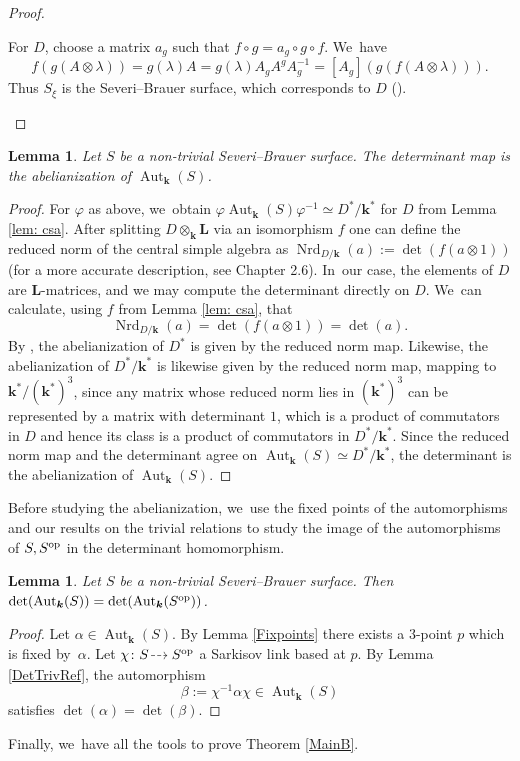 \documentclass[JEP,XML,SOM,Unicode,NoFloatCountersInSection, NoEqCountersInSection,published]{cedram}
\newcommand{\dradpl}{{\hspace*{-2mm}\begin{tikzcd}[ampersand replacement=\&,column sep = scriptsize]\mbox{}\ar[r,dashed]\&\mbox{}\end{tikzcd}\hspace*{-2mm}}}
\newcommand{\dratst}{{\hspace*{-2.5mm}\begin{tikzcd}[ampersand replacement=\&,column sep = small]\mbox{}\ar[r,dashed]\&\mbox{}\end{tikzcd}\hspace*{-2mm}}}
\let\drascst\dratst
\newcommand{\dra}{\mathchoice{\dradpl}{\dratst}{\drascst}{\drascst}}
\newcommand{\op}{\textup{op}}
\DeclareMathOperator{\Nrd}{Nrd}
\newtheorem{lemma}[theorem]{Lemma}
\theoremstyle{definition}
\newcommand{\kk}{{\boldsymbol{k}}}
\newcommand{\LL}{{\boldsymbol{L}}}
\DeclareMathOperator{\Aut}{Aut}
\begin{document}
\begin{proof}
\begin{itemize}
For $D$, choose a matrix $a_g$ such that $f \circ g = a_g \circ g \circ f$. We~have
\[
f(g(A \otimes \lambda)) = g(\lambda) A = g(\lambda) A_g A^g A_g^{-1} = [A_g] (g (f (A \otimes \lambda))).
\]
Thus $S_{\xi}$ is the Severi--Brauer surface, which corresponds to $D$ (\cite[Th.\,3.6]{jahnel}).\qedhere
\end{itemize}
\end{proof}

\begin{lemma} \label{AutAbel}
Let $S$ be a non-trivial Severi--Brauer surface. The determinant map is the abelianization of $\Aut_{\kk}(S)$.
\end{lemma}

\begin{proof}
For $\varphi$ as above, we~obtain $\varphi \Aut_{\kk}(S) \varphi^{-1} \simeq D^*/\kk^*$ for $D$ from Lemma \ref{lem: csa}. After splitting $D \otimes_{\kk} \LL$ via an isomorphism $f$ one can define the reduced norm of the central simple algebra as $\Nrd_{D/\kk}(a) := \det(f(a \otimes 1))$ (for a more accurate description, see \cite{Gille_Szamuely_2006} Chapter 2.6). In~our case, the elements of $D$ are $\LL$-matrices, and we may compute the determinant directly on $D$. We~can calculate, using $f$ from Lemma \ref{lem: csa}, that
\[
\Nrd_{D/\kk}(a) = \det(f(a \otimes 1)) = \det(a).
\]
By \cite{Wang}, the abelianization of $D^*$ is given by the reduced norm map. Likewise, the abelianization of $D^*/\kk^*$ is likewise given by the reduced norm map, mapping to $\kk^*/(\kk^*)^3$, since any matrix whose reduced norm lies in $(\kk^*)^3$ can be represented by a matrix with determinant $1$, which is a product of commutators in $D$ and hence its class is a product of commutators in $D^*/\kk^*$. Since the reduced norm map and the determinant agree on $\Aut_{\kk}(S) \simeq D^*/\kk^*$, the determinant is the abelianization of $\Aut_{\kk}(S)$.
\end{proof}

Before studying the abelianization, we~use the fixed points of the automorphisms and our results on the trivial relations to study the image of the automorphisms of $S,S^{\op}$ in the determinant homomorphism.

\begin{lemma} \label{ImageDET}
Let $S$ be a non-trivial Severi--Brauer surface. Then $\det(\Aut_{\kk}(S)) = \det(\Aut_{\kk}(S^{\op}))$.
\end{lemma}

\begin{proof}
Let $\alpha \in \Aut_{\kk}(S)$. By Lemma \ref{Fixpoints} there exists a $3$\nobreakdash-point $p$ which is fixed by~$\alpha$. Let $\chi \colon S \dra S^{\op}$ a Sarkisov link based at $p$. By Lemma \ref{DetTrivRef}, the automorphism
\[
\beta := \chi^{-1} \alpha \chi \in \Aut_{\kk}(S)
\]
satisfies $\det(\alpha) = \det(\beta)$.
\end{proof}
Finally, we~have all the tools to prove Theorem \ref{MainB}.
\end{document}

